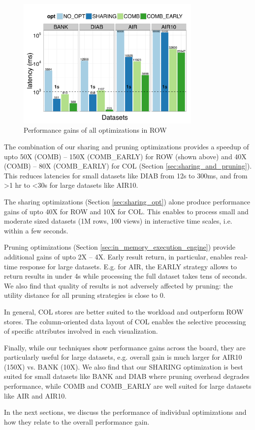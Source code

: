 \begin{figure}[h]
	\centering
	\includegraphics[width=9cm] {Images/all_opt_real_data_row.pdf}
	\caption{Performance gains of all optimizations in ROW}
	\label{fig:share_prune_row}
	\vspace{-15pt}
\end{figure}
 
\begin{denselist} 
\item The combination of our sharing and pruning optimizations provides a speedup of upto 50X (COMB) -- 150X (COMB\_EARLY) for ROW (shown above) and 40X (COMB) -- 80X (COMB\_EARLY) for COL (Section \ref{sec:sharing_and_pruning}).
This reduces latencies for small datasets like DIAB from 12s to 300ms, and from >1 hr to <30s for large datasets like AIR10.
\item The sharing optimizations (Section \ref{sec:sharing_opt}) alone produce performance gains of upto 40X for ROW and 10X for COL. This enables \SeeDB to process small and moderate sized datasets (1M rows, 100 views) in interactive time scales, i.e. within a few seconds.
\item Pruning optimizations (Section \ref{sec:in_memory_execution_engine}) provide additional gains of upto 2X -- 4X. Early result return, in particular, enables real-time response for large datasets. E.g. for AIR, the EARLY strategy allows \SeeDB to return results in under 4s while processing the full dataset takes tens of seconds. We also find that quality of results is not adversely affected by pruning: the utility distance for all pruning strategies is close to 0.
\item In general, COL stores are better suited to the \SeeDB workload and outperform ROW stores. The column-oriented data layout of COL enables the selective processing of specific attributes involved in each visualization. 
\item Finally, while our techniques show performance gains across the board, they are particularly useful for large datasets, e.g. overall gain is much larger for AIR10 (150X) vs. BANK (10X). We also find that our SHARING optimization is best suited for small datasets like BANK and DIAB where pruning overhead degrades performance, while COMB and COMB\_EARLY are well suited for large datasets like AIR and AIR10.
\end{denselist}

In the next sections, we discuss the performance of individual optimizations and how they relate to the overall performance gain.



